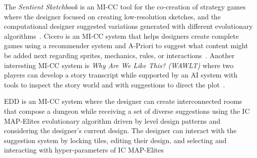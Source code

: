The \emph{Sentient Sketchbook} is an MI-CC tool for the co-creation of strategy games where the designer focused on creating low-resolution sketches, and the computational designer suggested variations generated with different evolutionary algorithms~. Cicero is an MI-CC system that helps designers create complete games using a recommender system and A-Priori to suggest what content might be added next regarding sprites, mechanics, rules, or interactions~. Another interesting MI-CC system is \emph{Why Are We Like This? (WAWLT)} where two players can develop a story transcript while supported by an AI system with tools to inspect the story world and with suggestions to direct the plot~.


EDD is an MI-CC system where the designer can create interconnected rooms that compose a dungeon while receiving a set of diverse suggestions using the IC MAP-Elites evolutionary algorithm driven by level design patterns and considering the designer's current design. The designer can interact with the suggestion system by locking tiles, editing their design, and selecting and interacting with hyper-parameters of IC MAP-Elites~






